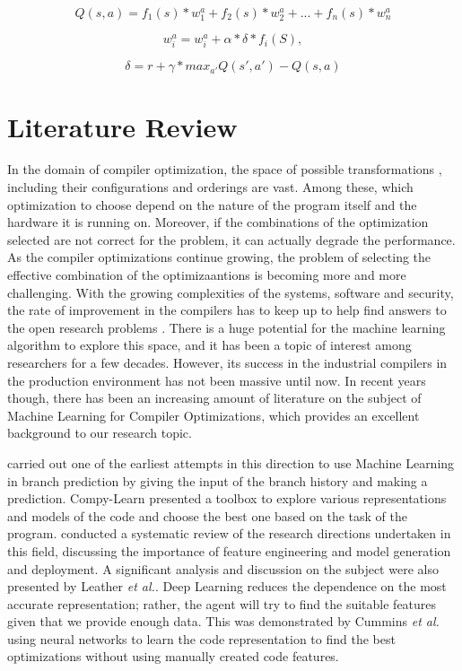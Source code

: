 \documentclass[logo,msc]{infthesis}           %
\begin{document}
\begin{equation}
Q(s,a) = f_1(s) * w_1^a + f_2(s) * w_2^a + ... + f_n(s) * w_n^a 
\label{eq:Q_Approx}
\end{equation}

\begin{equation}
w_i^a = w_i^a  + {\alpha} * {\delta} * f_i(S),
\label{eq:W_Approx}
\end{equation}

\begin{equation}
{\delta} = r + {\gamma} * max_{a'} Q(s',a') - Q(s,a)
\label{eq:delta}
\end{equation}

\section{Literature Review}

In the domain of compiler optimization, the space of possible transformations
, including their configurations and orderings are vast. Among these, which optimization to choose depend on the nature of the program itself and the hardware it is running on. Moreover, if the combinations of the optimization selected are not correct for the problem, it can actually degrade the performance.  As the compiler optimizations continue growing, the problem of selecting the effective combination of the optimizaantions is becoming more and more challenging.  With the growing complexities of the systems, software and security, the rate of improvement in the compilers has to keep up to help find answers to the open research problems \cite{compilerresearch}. There is a huge potential for the machine learning algorithm to explore this space, and it has been a topic of interest among researchers for a few decades. However, its success in the industrial compilers in the production environment has not been massive until now. In recent years though, there has been an increasing amount of literature on the subject of Machine Learning for Compiler Optimizations, which provides an excellent background to our research topic.

\cite{inproceedingsml} carried out one of the earliest attempts in this direction to use Machine Learning in branch prediction by giving the input of the branch history and making a prediction. Compy-Learn\cite{9232946} presented a toolbox to explore various representations and models of the code and choose the best one based on the task of the program. \cite{8357388} conducted a systematic review of the research directions undertaken in this field, discussing the importance of feature engineering and model generation and deployment. A significant analysis and discussion on the subject were also presented by Leather \textit{et al.}\cite{9232934}. Deep Learning reduces the dependence on the most accurate representation; rather, the agent will try to find the suitable features given that we provide enough data. This was demonstrated by Cummins \textit{et al.}\cite{inproceedingsdl} using neural networks to learn the code representation to find the best optimizations without using manually created code features.
\end{document}
